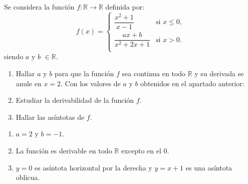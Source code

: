 {Se  considera la función $f:\mathbb{R}\to\mathbb{R}$ definida por:
\[\renewcommand{\arraystretch}{2}
f(x) =
\begin{cases}
\dfrac{x^2  + 1}{x - 1} & \mbox{si $x \leq 0$,} \\
\dfrac{ax + b}{x^2  + 2x + 1} & \mbox{si $x>0$.} \\
\end{cases}
\]
siendo $a$ y $b$ $\in \mathbb{R}$.
\begin{enumerate}
\item Hallar $a$ y $b$ para que la función $f$ sea continua en todo $\mathbb{R}$ y su derivada se anule en $x=2$.
Con los valores de $a$ y $b$ obtenidos en el apartado anterior:
\item Estudiar la derivabilidad de la función $f$.
\item Hallar las asíntotas de $f$.
\end{enumerate}
}
{\begin{enumerate}
\item $a=2$ y $b=-1$.
\item La función es derivable en  todo $\mathbb{R}$ excepto en el 0.
\item $y=0$ es asíntota horizontal por la derecha y  $y=x+1$ es una asíntota oblicua.
\end{enumerate}
}
